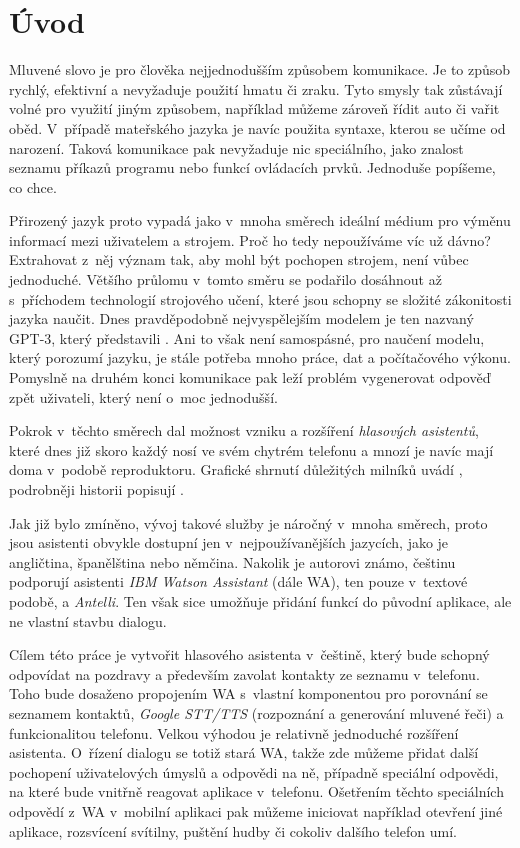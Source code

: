 \chapter*{Úvod}

Mluvené slovo je pro člověka nejjednodušším způsobem komunikace. Je to
způsob rychlý, efektivní a nevyžaduje použití hmatu či zraku. Tyto smysly
tak zůstávají volné pro využití jiným způsobem, například můžeme zároveň
řídit auto či vařit oběd. V~případě mateřského jazyka je navíc použita
syntaxe, kterou se učíme od narození. Taková komunikace pak nevyžaduje
nic speciálního, jako znalost seznamu příkazů programu nebo funkcí
ovládacích prvků. Jednoduše popíšeme, co chce.

Přirozený jazyk proto vypadá jako v~mnoha směrech ideální médium pro výměnu
informací mezi uživatelem a strojem. Proč ho tedy nepoužíváme víc už dávno?
Extrahovat z~něj význam tak, aby mohl být pochopen strojem, není vůbec
jednoduché. Většího průlomu v~tomto směru se podařilo dosáhnout až s~příchodem
technologií strojového učení, které jsou schopny se složité zákonitosti
jazyka  naučit. Dnes pravděpodobně nejvyspělejším modelem je
ten nazvaný GPT-3, který představili \citet{brown_language_2020}.
Ani to však není samospásné, pro naučení modelu,
který porozumí jazyku, je stále potřeba mnoho práce, dat a počítačového
výkonu. Pomyslně na druhém konci komunikace pak leží problém vygenerovat
odpověď zpět uživateli, který není o~moc jednodušší.

Pokrok v~těchto směrech dal možnost vzniku a rozšíření
\textit{hlasových asistentů}, které dnes již skoro každý nosí ve svém
chytrém telefonu a mnozí je navíc mají doma v~podobě 
reproduktoru. Grafické shrnutí důležitých milníků uvádí \citet{voicebotai_2021},
podrobněji historii popisují \citet[strany 523-524]{jurafsky_slp_2020}.

Jak již bylo zmíněno, vývoj takové služby je náročný v~mnoha
směrech, proto jsou asistenti obvykle dostupní jen v~nejpoužívanějších
jazycích, jako je angličtina, španělština nebo němčina. Nakolik je autorovi
známo, češtinu podporují asistenti \textit{IBM Watson Assistant}
(dále WA), ten pouze v~textové podobě, a \textit{Antelli}. Ten však sice
umožňuje přidání funkcí do původní aplikace, ale ne vlastní stavbu dialogu.

Cílem této práce je vytvořit hlasového asistenta v~češtině, který bude schopný
odpovídat na pozdravy a především zavolat kontakty ze seznamu v~telefonu.
Toho bude dosaženo propojením WA s~vlastní komponentou
pro porovnání se seznamem kontaktů, \textit{Google STT/TTS}
(rozpoznání a generování mluvené řeči) a funkcionalitou telefonu. Velkou výhodou
je relativně jednoduché rozšíření asistenta. O~řízení dialogu se totiž stará WA,
takže zde můžeme přidat další pochopení uživatelových úmyslů a odpovědi na ně,
případně speciální odpovědi, na které bude vnitřně reagovat aplikace v~telefonu.
Ošetřením těchto speciálních odpovědí z~WA v~mobilní aplikaci pak můžeme
iniciovat například otevření jiné aplikace, rozsvícení svítilny, puštění
hudby či cokoliv dalšího telefon umí.

